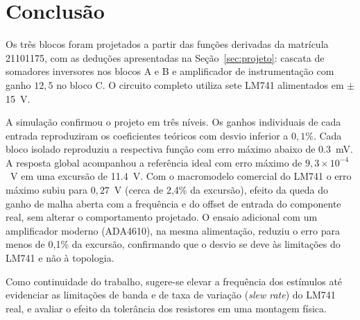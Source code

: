 \section{Conclusão}
\label{sec:conclusao}

Os três blocos foram projetados a partir das funções derivadas da
matrícula 21101175, com as deduções apresentadas na
Seção~\ref{sec:projeto}: cascata de somadores inversores nos blocos A
e B e amplificador de instrumentação com ganho $12{,}5$ no bloco C. O
circuito completo utiliza sete LM741 alimentados em
$\pm$\SI{15}{\volt}.

A simulação confirmou o projeto em três níveis. Os ganhos individuais
de cada entrada reproduziram os coeficientes teóricos com desvio
inferior a $0{,}1\%$. Cada bloco isolado reproduziu a respectiva
função com erro máximo abaixo de \SI{0.3}{\milli\volt}. A resposta
global acompanhou a referência ideal com erro máximo de
$9{,}3\times10^{-4}$~V em uma excursão de \SI{11.4}{\volt}. Com o
macromodelo comercial do LM741 o erro máximo subiu para $0{,}27$~V
(cerca de 2{,}4\% da excursão), efeito da queda do ganho de malha
aberta com a frequência e do offset de entrada do componente real, sem
alterar o comportamento projetado. O ensaio adicional com um
amplificador moderno (ADA4610), na mesma alimentação, reduziu o erro
para menos de 0{,}1\% da excursão, confirmando que o desvio se deve às
limitações do LM741 e não à topologia.

Como continuidade do trabalho, sugere-se elevar a frequência dos
estímulos até evidenciar as limitações de banda e de taxa de variação
(\emph{slew rate}) do LM741 real, e avaliar o efeito da tolerância dos
resistores em uma montagem física.

